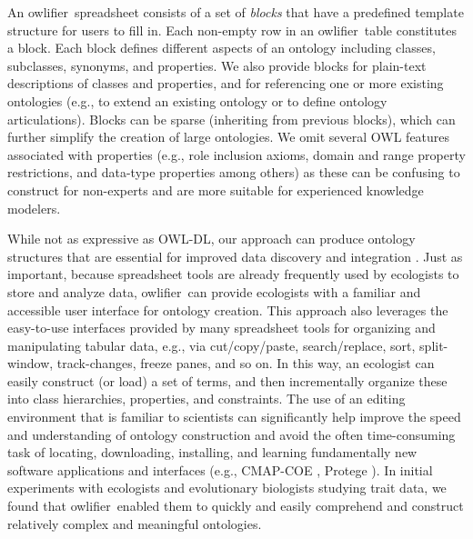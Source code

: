 \documentclass[5p,authoryear]{elsarticle}
\newcommand{\owlifier}{\textsf{owlifier}}
\begin{document}
An \owlifier\ spreadsheet consists of a set of \emph{blocks} that have a predefined template structure for users to fill in. Each non-empty row in an \owlifier\ table constitutes a block. Each block defines different aspects of an ontology including classes, subclasses, synonyms, and properties.  We also provide blocks for plain-text descriptions of classes and properties, and for referencing one or more existing ontologies (e.g., to extend an existing ontology or to define ontology articulations). Blocks can be sparse (inheriting from previous blocks), which can further simplify the creation of large ontologies. We omit several OWL features associated with properties (e.g., role inclusion axioms, domain and range property restrictions, and data-type properties among others) as these can be confusing to construct for non-experts and are more suitable for experienced knowledge modelers.

While not as expressive as OWL-DL, our approach can produce ontology structures that are essential for improved data discovery and integration \citep{madin07:_ontol_for_descr_and_synth}. Just as important, because spreadsheet tools are already frequently used by ecologists to store and analyze data, \owlifier\ can provide ecologists with a familiar and accessible user interface for ontology creation. This approach also leverages the easy-to-use interfaces provided by many spreadsheet tools for organizing and manipulating tabular data, e.g., via cut/copy/paste, search/replace, sort, split-window, track-changes, freeze panes, and so on.  In this way, an ecologist can easily construct (or load) a set of terms, and then incrementally organize these into class hierarchies, properties, and constraints.  The use of an editing environment that is familiar to scientists can significantly help improve the speed and understanding of ontology construction and avoid the often time-consuming task of locating, downloading, installing, and learning fundamentally new software applications and interfaces (e.g., CMAP-COE \citep{hayes05:_collab_knowl_captur_in_ontol}, Protege \citep{knublauch04:_editin_descr_logic_ontol_with}). In initial experiments with ecologists and evolutionary biologists studying trait data, we found that \owlifier\ enabled them to quickly and easily comprehend and construct relatively complex and meaningful ontologies.
\end{document}
